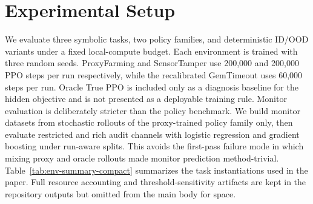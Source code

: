 \section{Experimental Setup}
We evaluate three symbolic tasks, two policy families, and deterministic ID/OOD variants under a fixed local-compute budget. Each environment is trained with three random seeds. ProxyFarming and SensorTamper use 200,000 and 200,000 PPO steps per run respectively, while the recalibrated GemTimeout uses 60,000 steps per run. Oracle True PPO is included only as a diagnosis baseline for the hidden objective and is not presented as a deployable training rule.
Monitor evaluation is deliberately stricter than the policy benchmark. We build monitor datasets from stochastic rollouts of the proxy-trained policy family only, then evaluate restricted and rich audit channels with logistic regression and gradient boosting under run-aware splits. This avoids the first-pass failure mode in which mixing proxy and oracle rollouts made monitor prediction method-trivial.
Table~\ref{tab:env-summary-compact} summarizes the task instantiations used in the paper. Full resource accounting and threshold-sensitivity artifacts are kept in the repository outputs but omitted from the main body for space.

